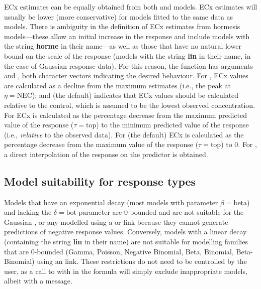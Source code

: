 \documentclass[
  shortnames]{jss}
\begin{document}
ECx estimates can be equally obtained from both  and  models. ECx estimates will usually be lower (more conservative) for  models fitted to the same data as  models. There is ambiguity in the definition of ECx estimates from hormesis models---these allow an initial increase in the response \citep[see][]{Mattson2008} and include models with the string \textbf{horme} in their name---as well as those that have no natural lower bound on the scale of the response (models with the string \textbf{lin} in their name, in the case of Gaussian response data). For this reason, the  function has arguments  and , both character vectors indicating the desired behaviour. For , ECx values are calculated as a decline from the maximum estimates (i.e., the peak at \(\eta = \text{NEC}\)); and  (the default) indicates that ECx values should be calculated relative to the control, which is assumed to be the lowest observed concentration. For  ECx is calculated as the percentage decrease from the maximum predicted value of the response (\(\tau = \text{top}\)) to the minimum predicted value of the response (i.e., \emph{relative} to the observed data). For  (the default) ECx is calculated as the percentage decrease from the maximum value of the response (\(\tau = \text{top}\)) to 0. For , a direct interpolation of the response on the predictor is obtained.

\hypertarget{model-suitability-for-response-types}{%
\subsection{Model suitability for response types}\label{model-suitability-for-response-types}}

Models that have an exponential decay (most models with parameter \(\beta = \text{beta}\)) and lacking the \(\delta = \text{bot}\) parameter are 0-bounded and are not suitable for the Gaussian , or any  modelled using a  or  link because they cannot generate predictions of negative response values. Conversely, models with a linear decay (containing the string \textbf{lin} in their name) are not suitable for modelling families that are 0-bounded (Gamma, Poisson, Negative Binomial, Beta, Binomial, Beta-Binomial) using an  link. These restrictions do not need to be controlled by the user, as a call to  with  in the formula will simply exclude inappropriate models, albeit with a message.
\end{document}

